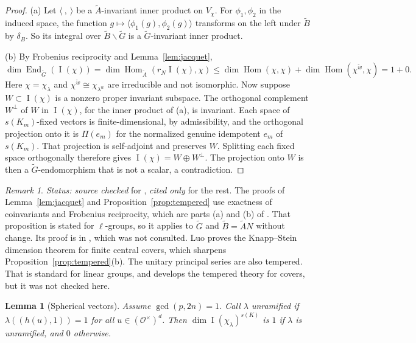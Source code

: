 \documentclass[12pt,letterpaper]{article}
\numberwithin{equation}{section}
\theoremstyle{plain}
\newtheorem{lemma}[theorem]{Lemma}
\theoremstyle{definition}
\theoremstyle{remark}
\newcounter{uvc}
\newtheorem{uvremark}[uvc]{Remark}
\newcommand{\Gt}{\widetilde G}
\newcommand{\At}{\widetilde A}
\newcommand{\Bt}{\widetilde B}
\newcommand{\wt}{\tilde w}
\newcommand{\Of}{\mathcal O}
\DeclareMathOperator{\PI}{I}
\DeclareMathOperator{\Hom}{Hom}
\begin{document}
\begin{proof}
(a) Let $\langle\ ,\ \rangle$ be a $\At$-invariant inner product on
$V_\chi$. For $\phi_1,\phi_2$ in the induced space, the function
$g\mapsto\langle\phi_1(g),\phi_2(g)\rangle$ transforms on the left
under $\Bt$ by $\delta_B$. So its integral over $\Bt\backslash\Gt$
is a $\Gt$-invariant inner product.

(b) By Frobenius reciprocity and Lemma~\ref{lem:jacquet},
\[
\dim\operatorname{End}_{\Gt}(\PI(\chi))
=\dim\Hom_{\At}(r_N\PI(\chi),\chi)
\le\dim\Hom(\chi,\chi)+\dim\Hom(\chi^{\wt},\chi)=1+0 .
\]
Here $\chi=\chi_\lambda$ and $\chi^{\wt}\cong\chi_{\lambda^w}$ are
irreducible and not isomorphic. Now suppose $W\subset\PI(\chi)$ is a
nonzero proper invariant subspace. The orthogonal complement $W^\perp$
of $W$ in $\PI(\chi)$, for the inner product of (a), is invariant. Each
space of $s(K_m)$-fixed vectors is finite-dimensional, by
admissibility, and the orthogonal projection onto it is $\Pi(e_m)$ for
the normalized genuine idempotent $e_m$ of $s(K_m)$. That projection is
self-adjoint and preserves $W$. Splitting each fixed space orthogonally
therefore gives $\PI(\chi)=W\oplus W^\perp$. The projection onto $W$
is then a $\Gt$-endomorphism that is not a scalar, a contradiction.
\end{proof}

\begin{uvremark}\label{uv:geometric}
\emph{Status: source checked} for \cite{BZ77}, \emph{cited only} for
the rest. The proofs of Lemma~\ref{lem:jacquet} and
Proposition~\ref{prop:tempered} use exactness of coinvariants and
Frobenius reciprocity, which are parts (a) and (b) of
\cite[Proposition~1.9]{BZ77}. That proposition is stated for
$\ell$-groups, so it applies to $\Gt$ and $\Bt=\At N$ without change.
Its proof is in \cite{BZ76}, which was not consulted. Luo \cite{Lu20}
proves the Knapp--Stein dimension theorem for finite central covers,
which sharpens Proposition~\ref{prop:tempered}(b). The unitary principal
series are also tempered. That is standard for linear groups, and
\cite{Li12} develops the tempered theory for covers, but it was not
checked here.
\end{uvremark}

\begin{lemma}[Spherical vectors]\label{lem:Kfixed}
Assume $\gcd(p,2n)=1$. Call $\lambda$ \emph{unramified} if
$\lambda((h(u),1))=1$ for all $u\in(\Of^\times)^d$. Then
$\dim\PI(\chi_\lambda)^{s(K)}$ is $1$ if $\lambda$ is unramified, and
$0$ otherwise.
\end{lemma}
\end{document}
